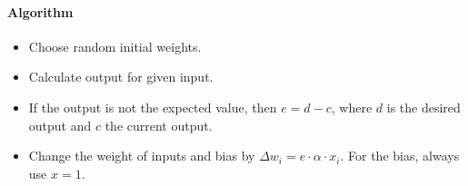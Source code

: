 \documentclass[main]{subfiles}
\begin{document}
\paragraph{Algorithm}
\begin{itemize}[noitemsep,nolistsep]
	\item Choose random initial weights.
	\item Calculate output for given input.
	\item If the output is not the expected value, then $e=d-c$, where $d$ is the desired output and $c$ the current output.
	\item Change the weight of inputs and bias by $\Delta w_i=e\cdot\alpha\cdot x_i$. For the bias, always use $x=1$.
\end{itemize}
\end{document}
